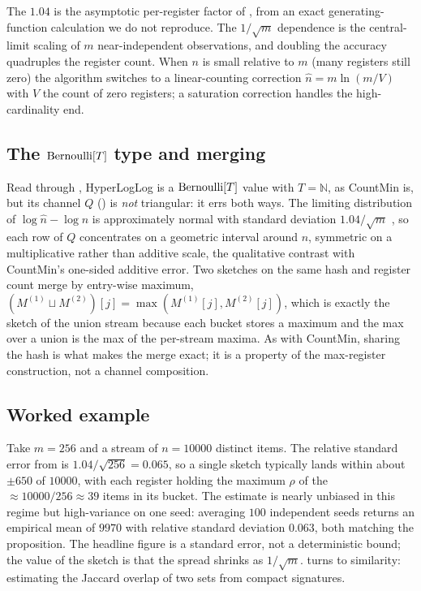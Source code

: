 The $1.04$ is the asymptotic per-register factor of
\textcite{flajolet-et-al-2007}, from an exact generating-function calculation we
do not reproduce. The $1/\sqrt{m}$ dependence is the central-limit scaling of
$m$ near-independent observations, and doubling the accuracy quadruples the
register count. When $n$ is small relative to $m$ (many registers still zero)
the algorithm switches to a linear-counting correction $\hat n = m \ln(m/V)$
with $V$ the count of zero registers; a saturation correction handles the
high-cardinality end.

\subsection*{The $\mathrm{Bernoulli}[T]$ type and merging}

Read through , HyperLogLog is a $\mathrm{Bernoulli}[T]$
value with $T = \mathbb{N}$, as CountMin is, but its channel $Q$
() is \emph{not} triangular: it errs both
ways. The
limiting distribution of $\log\hat n - \log n$ is approximately normal with
standard deviation $1.04/\sqrt{m}$ \parencite{flajolet-et-al-2007}, so each row of
$Q$ concentrates on a geometric interval around $n$, symmetric on a
multiplicative rather than additive scale, the qualitative contrast with
CountMin's one-sided additive error. Two sketches on the same hash and register
count merge by entry-wise maximum, $(M^{(1)} \sqcup M^{(2)})[j] =
\max(M^{(1)}[j], M^{(2)}[j])$, which is exactly the sketch of the union stream
because each bucket stores a maximum and the max over a union is the max of the
per-stream maxima. As with CountMin, sharing the hash is what makes the merge
exact; it is a property of the max-register construction, not a channel
composition.

\subsection*{Worked example}

Take $m = 256$ and a stream of $n = 10000$ distinct items. The relative standard
error from  is $1.04/\sqrt{256} = 0.065$, so a
single sketch typically lands within about $\pm 650$ of $10000$, with each
register holding the maximum $\rho$ of the $\approx 10000/256 \approx 39$ items
in its bucket. The estimate is nearly unbiased in this regime but high-variance
on one seed: averaging
$100$ independent seeds returns an empirical mean of $9970$ with relative
standard deviation $0.063$, both matching the proposition. The headline figure
is a standard error, not a deterministic bound; the value of the sketch is that
the spread shrinks as $1/\sqrt{m}$.  turns to similarity:
estimating the Jaccard overlap of two sets from compact signatures.
